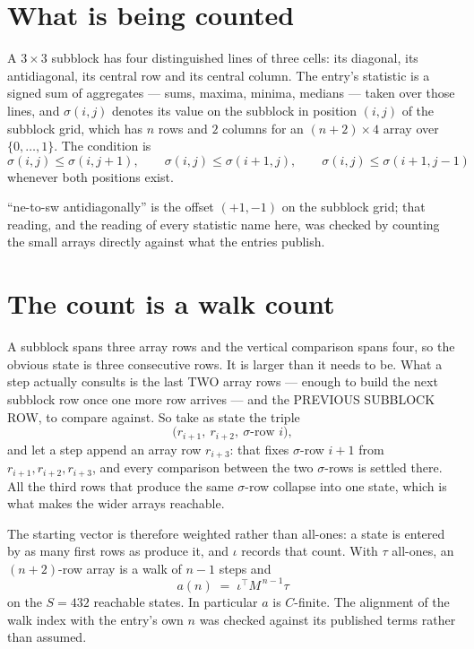 \documentclass[11pt,a4paper]{article}
\theoremstyle{plain}
\theoremstyle{definition}
\begin{document}
\section{What is being counted}

A $3\times3$ subblock has four distinguished lines of three cells: its diagonal, its
antidiagonal, its central row and its central column. The entry's statistic is a signed sum of
aggregates --- sums, maxima, minima, medians --- taken over those lines, and $\sigma(i,j)$
denotes its value on the subblock in position $(i,j)$ of the subblock grid, which has $n$ rows
and $2$ columns for an $(n+2)\times4$ array over $\{0,\dots,1\}$. The condition is
\[
\sigma(i,j)\le\sigma(i,j+1),\qquad \sigma(i,j)\le\sigma(i+1,j),\qquad \sigma(i,j)\le\sigma(i+1,j-1)
\]
whenever both positions exist.

``ne-to-sw antidiagonally'' is the offset $(+1,-1)$ on the subblock grid; that reading, and
the reading of every statistic name here, was checked by counting the small arrays directly
against what the entries publish.

\section{The count is a walk count}

A subblock spans three array rows and the vertical comparison spans four, so the obvious state
is three consecutive rows. It is larger than it needs to be. What a step actually consults is
the last TWO array rows --- enough to build the next subblock row once one more row arrives ---
and the PREVIOUS SUBBLOCK ROW, to compare against. So take as state the triple
\[
\bigl(r_{i+1},\ r_{i+2},\ \sigma\text{-row }i\bigr),
\]
and let a step append an array row $r_{i+3}$: that fixes $\sigma$-row $i+1$ from
$r_{i+1},r_{i+2},r_{i+3}$, and every comparison between the two $\sigma$-rows is settled
there. All the third rows that produce the same $\sigma$-row collapse into one state, which is
what makes the wider arrays reachable.

The starting vector is therefore weighted rather than all-ones: a state is entered by as many
first rows as produce it, and $\iota$ records that count. With $\tau$ all-ones, an
$(n+2)$-row array is a walk of $n-1$ steps and
\[
a(n)\;=\;\iota^{\!\top}M^{\,n-1}\tau
\]
on the $S=432$ reachable states. In particular $a$ is $C$-finite. The alignment of the walk
index with the entry's own $n$ was checked against its published terms rather than assumed.
\end{document}
